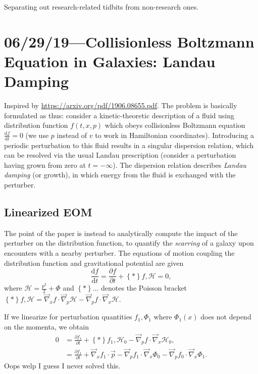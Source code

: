 \documentclass[12pt]{article}
\newcommand*{\rd}[2]{\frac{\mathrm{d}#1}{\mathrm{d}#2}}
\newcommand*{\pd}[2]{\frac{\partial#1}{\partial#2}}
\newcommand*{\z}[1]{\left\{#1\right\}}
\begin{document}
\pagestyle{fancy}
\cfoot{\thepage/\pageref{LastPage}}

Separating out research-related tidbits from non-research ones.

\tableofcontents

\section{06/29/19---Collisionless Boltzmann Equation in Galaxies: Landau Damping}

Inspired by \url{https://arxiv.org/pdf/1906.08655.pdf}. The problem is basically
formulated as thus: consider a kinetic-theoretic description of a fluid using
distribution function $f(t, x, p)$ which obeys collisionless Boltzmann equation
$\rd{f}{t} = 0$ (we use $p$ instead of $v$ to work in Hamiltonian coordinates).
Introducing a periodic perturbation to this fluid results in a singular
dispersion relation, which can be resolved via the usual Landau prescription
(consider a perturbation having grown from zero at $t=-\infty$). The dispersion
relation describes \emph{Landau damping} (or growth), in which energy from the
fluid is exchanged with the perturber.

\subsection{Linearized EOM}

The point of the paper is instead to analytically compute the impact of the
perturber on the distribution function, to quantify the \emph{scarring} of a
galaxy upon encounters with a nearby perturber. The equations of motion coupling
the distribution function and gravitational potential are given
\begin{equation}
    \rd{f}{t} = \pd{f}{t} + \z*{f, \mathcal{H}} = 0,
\end{equation}
where $\mathcal{H} = \frac{p^2}{2} + \Phi$ and $\z*{\dots}$ denotes the Poisson
bracket $\z*{f, \mathcal{H}} = \vec{\nabla}_xf \cdot \vec{\nabla}_p \mathcal{H}
- \vec{\nabla}_pf \cdot \vec{\nabla}_x\mathcal{H}$.

If we linearize for perturbation quantities $f_1, \Phi_1$ where $\Phi_1(x)$ does
not depend on the momenta, we obtain
\begin{align*}
    0 &= \pd{f_1}{t} + \z*{f_1, \mathcal{H}_0}
            - \vec{\nabla}_pf \cdot \vec{\nabla}_x \mathcal{H}_0,\\
        &= \pd{f_1}{t} + \vec{\nabla}_x f_1 \cdot \vec{p}
            - \vec{\nabla}_p f_1 \cdot \vec{\nabla}_x \Phi_0
            - \vec{\nabla}_p f_0 \cdot \vec{\nabla}_x \Phi_1.
\end{align*}
Oops welp I guess I never solved this.
\end{document}
